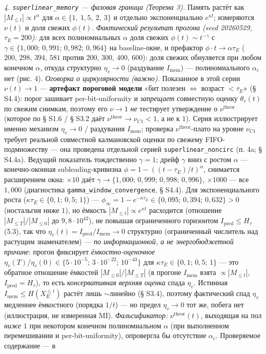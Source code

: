 \documentclass[12pt]{iopart}
\begin{document}
\emph{4. \texttt{superlinear\_memory} --- фазовая граница (Теорема 3).} Память растёт как \(|M_{\le t}| \propto t^\alpha\) для \(\alpha \in \{1,\ 1{,}5,\ 2,\ 3\}\) и отдельно экспоненциально \(e^{\kappa t}\); измеряются \(\nu(t)\) и доля свежих \(\phi(t)\). \emph{Фактический результат прогона (seed 20260529, \(\tau_E = 200\)):} для всех полиномиальных \(\alpha\) доля свежих \(\phi(t) \sim t^{-\gamma}\) с \(\gamma \in \{1{,}000;\,0{,}991;\,0{,}982;\,0{,}964\}\) на baseline-окне, и префактор \(\phi\cdot t \to \alpha\tau_E\) (\(200,\,298,\,394,\,581\) против \(200,\,300,\,400,\,600\)): доля свежих обнуляется при любом конечном \(\alpha\), откуда структурно \(\eta_v \to 0\) (раздувание \(I_{\text{mem}}\)) --- полиномиального \(\alpha_c\) нет (рис. 4). \emph{Оговорка о циркулярности (важно).} Показанное в этой серии \(\nu(t) \to 1\) --- \textbf{артефакт пороговой модели} «бит полезен \(\Leftrightarrow\) возраст \(< \tau_E\)» (§ S4.4): порог зашивает per-bit-uniformity и \emph{запрещает} совместную оценку \(\theta_v(t)\) по свежим снимкам, поэтому его \(\nu \to 1\) \emph{не} тестирует утверждение о \(\nu^{\text{theor}}\) (которое по § S1.6 / § S3.2 даёт \(\nu^{\text{theor}} \to \nu_{C1} < 1\), а не к \(1\)). Серия иллюстрирует именно механизм \(\eta_v \to 0\) / раздувания \(I_{\text{mem}}\); проверка \(\nu^{\text{theor}}\)-плато на уровне \(\nu_{C1}\) требует реальной совместной калмановской оценки по свежему FIFO-подмножеству --- она проведена отдельной серией \texttt{superlinear\_noncirc} (п. 4a; § S4.4a). Ведущий показатель тождественно \(\gamma = 1\); дрейф \(\gamma\) вниз с ростом \(\alpha\) --- конечно-оконная subleading-кривизна \(\phi = 1-((t-\tau_E)/t)^\alpha\), снимается расширением окна: \(\times10\) даёт \(\gamma \to \{1{,}000;\,0{,}999;\,0{,}998;\,0{,}996\}\), \(\times1000\) --- все \(1{,}000\) (диагностика \texttt{gamma\_window\_convergence}, § S4.4). Для экспоненциального роста (\(\kappa\tau_E \in \{0{,}1;\,0{,}5;\,1\}\)) --- \(\phi_\infty = 1-e^{-\kappa\tau_E} \in \{0{,}095;\,0{,}394;\,0{,}632\} > 0\) (ностальгия ниже \(1\)), но ёмкость \(|M_{\le t}| \propto e^{\kappa t}\) расходится (отношение \(|M_{\le T}|/|M_{\le 0}|\) до \(9{,}8\cdot10^{42}\)), не повышая ограниченного горизонтом \(I_{\text{pred}} \le H_\tau\) (5.3), так что \(\eta_v(t) = I_{\text{pred}}/I_{\text{mem}} \to 0\) структурно (ограниченный числитель над растущим знаменателем) --- \emph{по информационной, а не энергобюджетной причине}: прогон фиксирует \emph{ёмкостно-оценочное} \(\eta_v(T)/\eta_v(0) \in \{5\cdot10^{-5};\,3\cdot10^{-22};\,10^{-43}\}\) для \(\kappa\tau_E \in \{0{,}1;\,0{,}5;\,1\}\) --- это обратное отношение ёмкостей \(|M_{\le 0}|/|M_{\le T}|\) (в прогоне \(I_{\text{mem}}\) взята \(\propto |M_{\le t}|\), \(I_{\text{pred}} = H_\tau\)), то есть \emph{консервативная верхняя оценка} спада \(\eta_v\). Истинная \(I_{\text{mem}} \le H(X_E^{\le t})\) растёт лишь \(\sim\)линейно (§ S3.4), поэтому фактический спад \(\eta_v\) медленнее ёмкостного (порядка \(1/t\)) --- но предел \(\eta_v \to 0\) тот же, побега нет (иллюстрация, не измеренная MI). \emph{Фальсификатор:} \(\nu^{\text{theor}}(t)\), выходящая на пол \emph{ниже \(1\)} при некотором конечном полиномиальном \(\alpha\) (при выполненном перемешивании и per-bit-uniformity), опровергла бы отсутствие \(\alpha_c\). Проверяемое содержание --- в 
\end{document}
